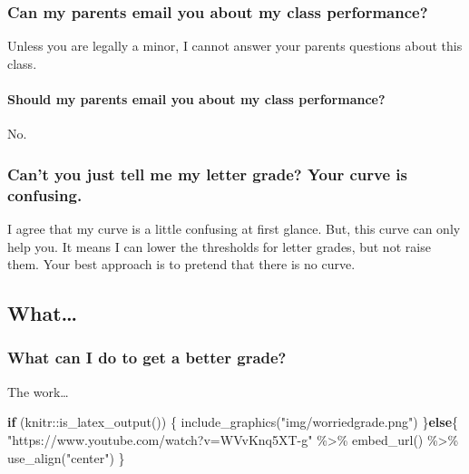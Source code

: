 \documentclass[
]{book}
\newenvironment{Shaded}{\begin{snugshade}}{\end{snugshade}}
\newcommand{\ControlFlowTok}[1]{\textcolor[rgb]{0.13,0.29,0.53}{\textbf{#1}}}
\newcommand{\FunctionTok}[1]{\textcolor[rgb]{0.00,0.00,0.00}{#1}}
\newcommand{\NormalTok}[1]{#1}
\newcommand{\SpecialCharTok}[1]{\textcolor[rgb]{0.00,0.00,0.00}{#1}}
\newcommand{\StringTok}[1]{\textcolor[rgb]{0.31,0.60,0.02}{#1}}
\begin{document}
\hypertarget{can-my-parents-email-you-about-my-class-performance}{%
\subsubsection{Can my parents email you about my class performance?}\label{can-my-parents-email-you-about-my-class-performance}}

Unless you are legally a minor, I cannot answer your parents questions about this class.

\hypertarget{should-my-parents-email-you-about-my-class-performance}{%
\paragraph{Should my parents email you about my class performance?}\label{should-my-parents-email-you-about-my-class-performance}}

No.

\hypertarget{cant-you-just-tell-me-my-letter-grade-your-curve-is-confusing.}{%
\subsubsection{Can't you just tell me my letter grade? Your curve is confusing.}\label{cant-you-just-tell-me-my-letter-grade-your-curve-is-confusing.}}

I agree that my curve is a little confusing at first glance.
But, this curve can only help you. It means I can lower the thresholds for letter grades, but not raise them.
Your best approach is to pretend that there is no curve.

\hypertarget{what}{%
\subsection{What\ldots{}}\label{what}}

\hypertarget{what-can-i-do-to-get-a-better-grade}{%
\subsubsection{What can I do to get a better grade?}\label{what-can-i-do-to-get-a-better-grade}}

The work\ldots{}

\begin{Shaded}
\begin{Highlighting}[]
\ControlFlowTok{if}\NormalTok{ (knitr}\SpecialCharTok{::}\FunctionTok{is\_latex\_output}\NormalTok{()) \{}
\FunctionTok{include\_graphics}\NormalTok{(}\StringTok{"img/worriedgrade.png"}\NormalTok{)}
\NormalTok{\}}\ControlFlowTok{else}\NormalTok{\{}
\StringTok{"https://www.youtube.com/watch?v=WVvKnq5XT{-}g"} \SpecialCharTok{\%\textgreater{}\%}
\FunctionTok{embed\_url}\NormalTok{() }\SpecialCharTok{\%\textgreater{}\%}
  \FunctionTok{use\_align}\NormalTok{(}\StringTok{"center"}\NormalTok{)}
\NormalTok{\}}
\end{Highlighting}
\end{Shaded}
\end{document}

